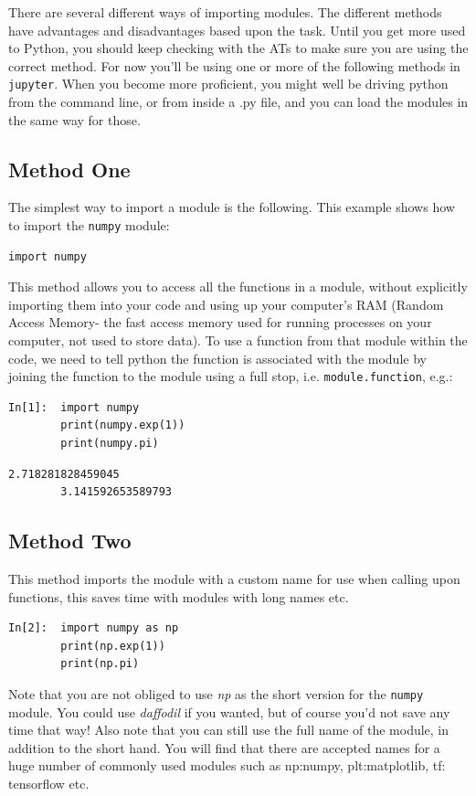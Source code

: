 There are several different ways of importing modules. The different methods have advantages and disadvantages based upon the task. Until you get more used to Python, you should keep checking with the ATs to make sure you are using the correct method. For now you'll be using one or more of the following methods in \texttt{jupyter}. When you become more proficient, you might well be driving python from the command line, or from inside a .py file, and you can load the modules in the same way for those.

\newpage

\subsection{Method One}
The simplest way to import a module is the following. This example shows how to import the \texttt{numpy}  module:
\begin{lstlisting}[style=PY]
import numpy
\end{lstlisting}
This method allows you to access all the functions in a module, without explicitly importing them into your code and using up your computer's RAM (Random Access Memory- the fast access memory used for running processes on your computer, not used to store data). To use a function from that module within the code, we need to tell python the function is associated with the module by joining the function to the module using a full stop, i.e. {\tt module.function}, e.g.:
\begin{lstlisting}[style=PY]
In[1]:  import numpy
        print(numpy.exp(1))
        print(numpy.pi)
\end{lstlisting}
\begin{lstlisting}[style=PY_out]
        2.718281828459045
        3.141592653589793
\end{lstlisting}

\subsection{Method Two}
This method imports the module with a custom name for use when calling upon functions, this saves time with modules with long names etc.
\begin{lstlisting}[style=PY]
In[2]:  import numpy as np
        print(np.exp(1))
        print(np.pi)
\end{lstlisting}
 Note that you are not obliged to use {\it np} as the short version for the {\tt numpy} module. You could use {\it daffodil} if you wanted, but of course you'd not save any time that way! Also note that you can still use the full name of the module, in addition to the short hand. You will find that there are accepted names for a huge number of commonly used modules such as np:numpy, plt:matplotlib, tf: tensorflow etc.


